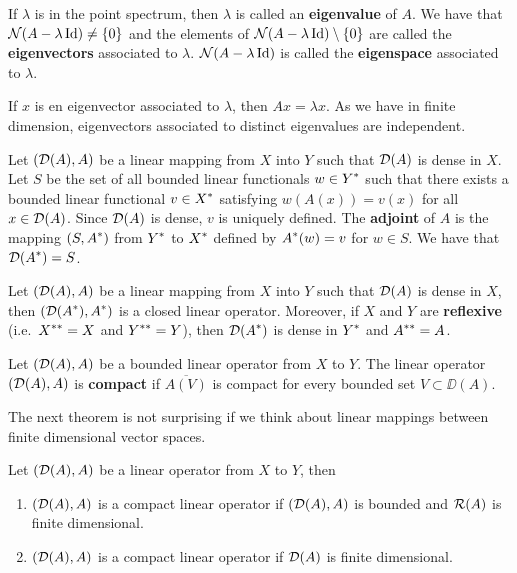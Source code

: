 \begin{defn}
If $\lambda$ is in the point spectrum, then $\lambda$ is called
an {\bfseries eigenvalue} of $A$.  We
have that $\mathcal{N}(A-\lambda\operatorname{Id}) \neq \{0\}$ and the elements of
$\mathcal{N}(A-\lambda\operatorname{Id}) \setminus \{0\}$ are
called the {\bfseries eigenvectors}
associated to $\lambda$.  $\mathcal{N}(A-\lambda\operatorname{Id})$ is called the
{\bfseries eigenspace} associated to
$\lambda$.
\end{defn}

If $x$ is en eigenvector associated to $\lambda$, then $Ax = \lambda x$.
As we have in finite dimension, eigenvectors associated to distinct
eigenvalues are independent.

\begin{defn}
Let $(\mathcal{D}(A),A)$ be a linear mapping from $X$ into $Y$ such that
$\mathcal{D}(A)$ is dense in $X$.  Let $S$ be the set of all bounded linear
functionals $\displaystyle w \in Y^\ast$ such that there exists a
bounded linear functional $\displaystyle v \in X^\ast$ satisfying
$w(A(x)) = v(x)$ for all $x \in \mathcal{D}(A)$.
Since $\mathcal{D}(A)$ is dense, $v$ is uniquely defined.  The
{\bfseries adjoint}
of $A$ is the mapping $\displaystyle (S,A^\ast)$ from $\displaystyle Y^\ast$
to $\displaystyle X^\ast$ defined by $\displaystyle A^\ast(w) = v$ for
$w\in S$.  We have that $\displaystyle \mathcal{D}(A^\ast) = S$.
\end{defn}

\begin{theorem}
Let $(\mathcal{D}(A),A)$ be a linear mapping from $X$ into $Y$ such that
$\mathcal{D}(A)$ is dense in $X$, then $\displaystyle (\mathcal{D}(A^\ast),A^\ast)$ is a closed
linear operator.  Moreover, if $X$ and $Y$ are
{\bfseries reflexive}
(i.e.\ $\displaystyle X^{\ast\ast}=X$ and $\displaystyle Y^{\ast\ast} = Y$),
then $\displaystyle \mathcal{D}(A^\ast)$ is dense in
$\displaystyle Y^\ast$ and $\displaystyle A^{\ast\ast} = A$.
\end{theorem}

\begin{defn}
Let $(\mathcal{D}(A),A)$ be a bounded linear operator from $X$ to $Y$.  The
linear operator $(\mathcal{D}(A),A)$ is
{\bfseries compact} if
$\overline{A(V)}$ is compact for every bounded set $V \subset \DD(A)$.
\end{defn}

The next theorem is not surprising if we think about linear mappings
between finite dimensional vector spaces.

\begin{theorem}
Let $(\mathcal{D}(A),A)$ be a linear operator from $X$ to $Y$, then
\begin{enumerate}
\item $(\mathcal{D}(A),A)$ is a compact linear operator if $(\mathcal{D}(A),A)$ is
bounded and $\mathcal{R}(A)$ is finite dimensional.
\item $(\mathcal{D}(A),A)$ is a compact linear operator if $\mathcal{D}(A)$ is finite
dimensional.
\end{enumerate}
\end{theorem}

